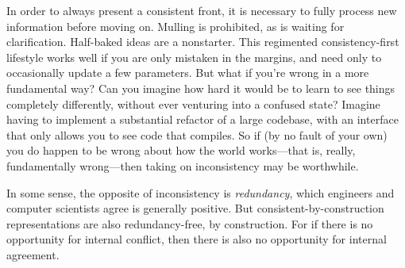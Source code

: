 In order to always present a consistent front, it is necessary to fully process new information before moving on. Mulling is prohibited, as
is waiting for clarification.
Half-baked ideas are a nonstarter.
This regimented consistency-first lifestyle works well if you are only mistaken in the margins, and need only to occasionally update a few parameters.
But what if you're wrong in a more fundamental way?
Can you imagine how hard it would be to learn to see things completely differently, without ever venturing into a confused state?
Imagine having to implement a substantial refactor of a large codebase, with an interface that only allows you to see code that compiles.
So if (by no fault of your own) you do happen to be wrong about how the world works---that is, really, fundamentally wrong---then taking on inconsistency may be worthwhile.


In some sense, the opposite of inconsistency is \emph{redundancy}, which engineers and computer scientists agree is generally positive. 
But consistent-by-construction representations are also redundancy-free, by construction. 
For if there is no opportunity for internal conflict, then there is also no opportunity for internal agreement. 

